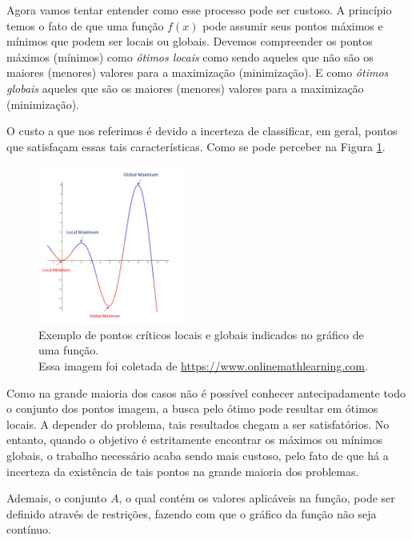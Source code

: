 Agora vamos tentar entender como esse processo pode ser custoso. A princípio
temos o fato de que uma função \( f(x) \) pode assumir seus pontos máximos e
mínimos que podem ser locais ou globais. Devemos compreender os pontos máximos
(mínimos) como \textit{ótimos locais} como sendo aqueles que não
são os maiores (menores) valores para a maximização (minimização). E como
\textit{ótimos globais} aqueles que são os maiores (menores)
valores para a maximização (minimização).

O custo a que nos referimos é devido a incerteza de classificar, em geral, pontos que
satisfaçam essas tais características. Como se pode perceber na Figura
\ref{grafico_local_global_pontosCriticos}.

\begin{figure}[h]
    \centering
    \includegraphics[width=0.43\textwidth]{src/grafico_local_global_pontosCriticos.png}
    \captionsetup{justification=centering}
    \caption{
      Exemplo de pontos críticos locais e globais indicados no gráfico de uma função.\\
      \tiny Essa imagem foi coletada de \url{https://www.onlinemathlearning.com}.
    }
    \label{grafico_local_global_pontosCriticos}
\end{figure}

Como na grande maioria dos casos não é possível conhecer antecipadamente todo o
conjunto dos pontos imagem, a busca pelo ótimo pode resultar em ótimos locais.
A depender do problema, tais resultados chegam a ser satisfatórios. No entanto,
quando o objetivo é estritamente encontrar os máximos ou mínimos globais, o
trabalho necessário acaba sendo mais custoso, pelo fato
de que há a incerteza da existência de tais pontos na grande maioria dos
problemas.

Ademais, o conjunto $A$, o qual contém os valores aplicáveis na função, pode
ser definido através de restrições, fazendo com que o gráfico da função não
seja contínuo.

